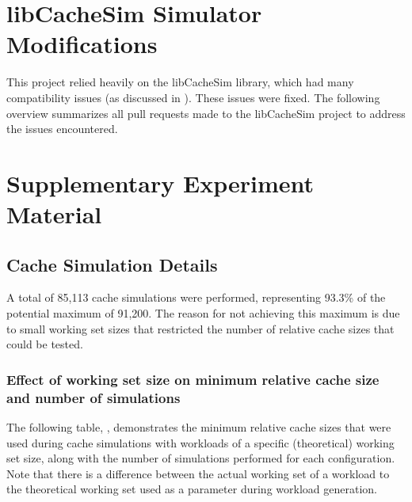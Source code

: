 \appendix

\chapter{libCacheSim Simulator Modifications}\label{PRs}

This project relied heavily on the libCacheSim library, which had many compatibility issues (as discussed in ). These issues were fixed. The following overview summarizes all pull requests made to the libCacheSim project to address the issues encountered.



\chapter{Supplementary Experiment Material}

\section{Cache Simulation Details}

A total of 85,113 cache simulations were performed, representing 93.3\% of the potential maximum of 91,200. The reason for not achieving this maximum is due to small working set sizes that restricted the number of relative cache sizes that could be tested.

\subsection{Effect of working set size on minimum relative cache size and number of simulations}\label{appendix: working-set-size-vs-relative-cache-size}

The following table, , demonstrates the minimum relative cache sizes that were used during cache simulations with workloads of a specific (theoretical) working set size, along with the number of simulations performed for each configuration. Note that there is a difference between the actual working set of a workload to the theoretical working set used as a parameter during workload generation.

